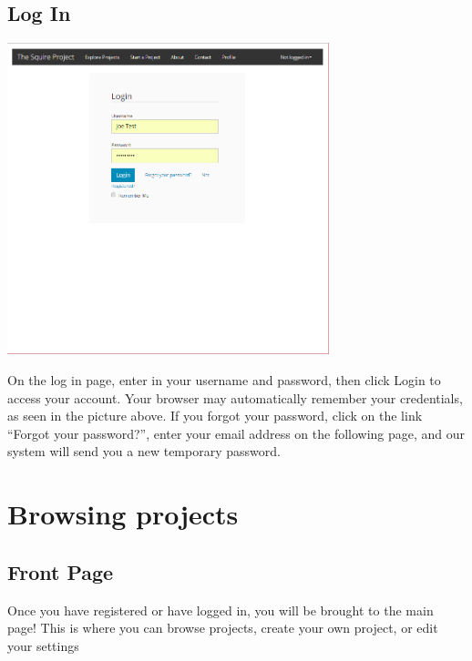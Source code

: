 \documentclass[11pt]{report}
\begin{document}
\subsection{Log In}
	\begin{center}
           \includegraphics[width=0.7\textwidth]{userguide/login}
    \end{center}
    On the log in page, enter in your username and password, then click Login to access your account. Your browser may automatically remember your credentials, as seen in the picture above. If you forgot your password, click on the link “Forgot your password?”, enter your email address on the following page, and our system will send you a new temporary password.


\section{Browsing projects}      
\subsection{Front Page}        	
    Once you have registered or have logged in, you will be brought to the main page! This is where you can browse projects, create your own project, or edit your settings
\end{document}
